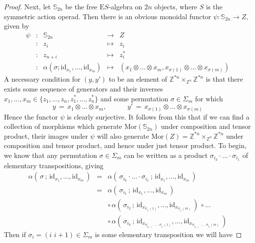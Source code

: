 \documentclass{amsbook} %
\numberwithin{section}{chapter}
\begin{document}
\begin{proof}
Next, let $\mathbb{S}_{2n}$ be the free $\mathrm{E}S$-algebra on $2n$ objects, where $S$ is the symmetric action operad. Then there is an obvious monoidal functor $\psi : \mathbb{S}_{2n} \to Z$, given by
\[ \begin{array}{rcrcl}
			\psi & : & \mathbb{S}_{2n} & \to & Z \\
			 & : & z_i & \mapsto & z_i \\
			 & : & z_{n+i} & \mapsto & z_i^* \\
			 & : & \alpha(\sigma; \mathrm{id}_{x_1}, ..., \mathrm{id}_{x_m}) & \mapsto & (x_1 \otimes ... \otimes x_m, x_{\sigma(1)} \otimes ... \otimes x_{\sigma(m)})
		\end{array}
\]
A necessary condition for $(y, y')$ to be an element of $\mathbb{Z}^{\ast n} \times_{\mathbb{Z}^n} \mathbb{Z}^{\ast n}$ is that there exists some sequence of generators and their inverses $x_1, ..., x_m \in \{z_1, ..., z_n, z_1^*, ..., z_n^*\}$ and some permutation $\sigma \in \Sigma_m$ for which
\[ y \, = \, x_1 \otimes ... \otimes x_m, \quad \quad \quad y' \, = \, x_{\sigma(1)} \otimes ... \otimes x_{\sigma(m)} \]
Hence the functor $\psi$ is clearly surjective. It follows from this that if we can find a collection of morphisms which generate $\mathrm{Mor}(\mathbb{S}_{2n})$ under composition and tensor product, their images under $\psi$ will also generate $\mathrm{Mor}(Z) = \mathbb{Z}^{\ast n} \times_{\mathbb{Z}^n} \mathbb{Z}^{\ast n}$ under composition and tensor product, and hence under just tensor product. To begin, we know that any permutation $\sigma \in \Sigma_m$ can be written as a product $\sigma_{i_k} \cdot ... \cdot \sigma_{i_1}$ of elementary transpositions, giving
\[ \begin{array}{rlll}
			\alpha( \, \sigma \, ; \, \mathrm{id}_{x_1}, ..., \mathrm{id}_{x_m} \, ) & = & \alpha( \, \sigma_{i_k} \cdot ... \cdot \sigma_{i_1} \, ; \,  \mathrm{id}_{x_1}, ..., \mathrm{id}_{x_m} \, ) \\
			& = &  \alpha( \, \sigma_{i_1} \, ; \,  \mathrm{id}_{x_1}, ..., \mathrm{id}_{x_m} \, )  \\
			& & \circ \, \alpha( \, \sigma_{i_2} \, ; \,  \mathrm{id}_{x_{\sigma_{i_1}(1)}}, ..., \mathrm{id}_{x_{\sigma_{i_1}(m)}} \, ) \, \circ ... \\
			& & \circ \, \alpha( \, \sigma_{i_k} \, ; \,  \mathrm{id}_{x_{\sigma_{i_{k-1}} \cdot ... \cdot \sigma_{i_1}(1)}}, ..., \mathrm{id}_{x_{\sigma_{i_{k-1}} \cdot ... \cdot \sigma_{i_1}(m)}} \, )
		\end{array}
\]
Then if $\sigma_i = (i \, \, i+1) \in \Sigma_m$ is some elementary transposition we will have

\end{proof}
\end{document}

